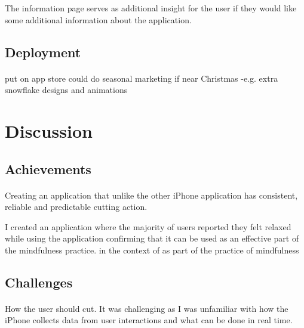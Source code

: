 \documentclass[11pt]{article}
\begin{document}
                The information page serves as additional insight for the user if they would like some additional information about the application. 
                
               



    \subsection{Deployment}
        \paragraph{}
        put on app store
        could do seasonal marketing if near Christmas -e.g. extra snowflake designs and animations
        
    
\newpage
\section{Discussion}
    \paragraph{}

    
    \subsection{Achievements}
    
        \paragraph{}
        Creating an application that unlike the other iPhone application has consistent, reliable and predictable cutting action. 
        
        I created an application where the majority of users reported they felt relaxed while using the application confirming that it can be used 
        as an effective part of the mindfulness practice. 
        in the context of as part of the practice of mindfulness 
    
    \subsection{Challenges}
    
        \paragraph{}
        How the user should cut. It was challenging as I was unfamiliar with how the iPhone collects data from user interactions and what can be done in real time. 
        
\end{document}
